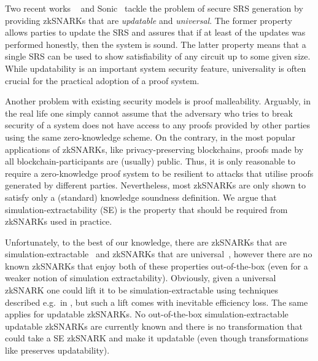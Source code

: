 \documentclass[runningheads,11pt]{llncs}
\begin{document}
Two recent works \plonk{}~\cite{EPRINT:GabWilCio19} and
Sonic{}~\cite{CCS:MBKM19} tackle the problem of secure SRS generation by
providing zkSNARKs that are \emph{updatable} and \emph{universal}.  The former
property allows parties to update the SRS and assures that if at least of the
updates was performed honestly, then the system is sound.  The latter property
means that a single SRS can be used to show satisfiability of any circuit up to
some given size. While updatability is an important system security feature,
universality is often crucial for the practical adoption of a proof system.

Another problem with existing security models is proof malleability.  Arguably,
in the real life one simply cannot assume that the adversary who tries to break
security of a system does not have access to any proofs provided by other
parties using the same zero-knowledge scheme. On the contrary, in the most
popular applications of zkSNARKs, like privacy-preserving blockchains, proofs
made by all blockchain-participants are (usually) public. Thus, it is only
reasonable to require a zero-knowledge proof system to be resilient to attacks
that utilise proofs generated by different parties.  Nevertheless, most zkSNARKs
are only shown to satisfy only a (standard) knowledge soundness definition. We
argue that simulation-extractability (SE) is the property that should be
required from zkSNARKs used in practice.

Unfortunately, to the best of our knowledge, there are zkSNARKs that are
simulation-extractable~\cite{C:GroMal17,EPRINT:BowGab18,EPRINT:AtaBag19,EC:Groth16}
and zkSNARKs that are
universal~\cite{C:GKMMM18,CCS:MBKM19,EPRINT:GabWilCio19,EC:CHMMVW20}, however
there are no known zkSNARKs that enjoy both of these properties out-of-the-box
(even for a weaker notion of simulation extractability). Obviously, given a
universal zkSNARK one could lift it to be simulation-extractable using
techniques described e.g.~in \cite{EPRINT:KZMQCP15,CCS:AbdRamSla20}, but such a
lift comes with inevitable efficiency loss.  The same applies for updatable
zkSNARKs. No out-of-the-box simulation-extractable updatable zkSNARKs are
currently known and there is no transformation that could take a SE zkSNARK and
make it updatable (even though transformations like \cite{CCS:AbdRamSla20}
preserves updatability).
\end{document}

